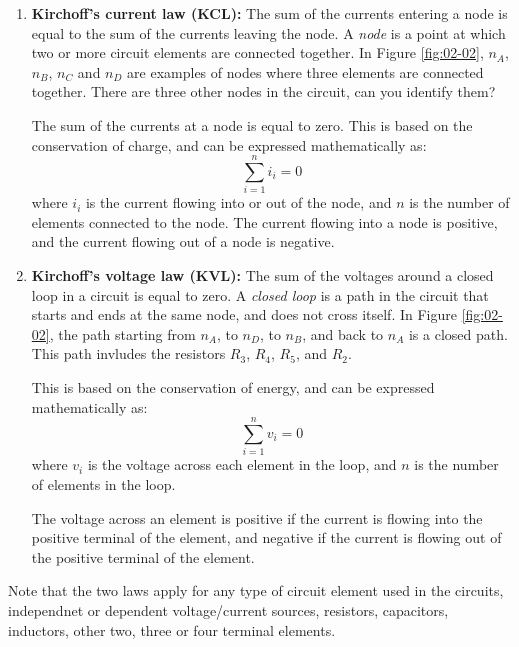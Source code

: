 \begin{enumerate}
    \item \textbf{Kirchoff's current law (KCL):} The sum of the currents entering a node is equal to the sum of the currents leaving the node. A \textit{node} is a point at which two or more circuit elements are connected together. In Figure \ref{fig:02-02}, $n_A$, $n_B$, $n_C$ and $n_D$ are examples of nodes where three elements are connected together. There are three other nodes in the circuit, can you identify them? 
    
    The sum of the currents at a node is equal to zero. This is based on the conservation of charge, and can be expressed mathematically as:
    \begin{equation}
        \sum_{i=1}^{n} i_i = 0
        \label{eq:ch02-11}
    \end{equation}
    where $i_i$ is the current flowing into or out of the node, and $n$ is the number of elements connected to the node. The current flowing into a node is positive, and the current flowing out of a node is negative.
    
    \item \textbf{Kirchoff's voltage law (KVL):} The sum of the voltages around a closed loop in a circuit is equal to zero. A \textit{closed loop} is a path in the circuit that starts and ends at the same node, and does not cross itself. In Figure \ref{fig:02-02}, the path starting from $n_A$, to $n_D$, to $n_B$, and back to $n_A$ is a closed path. This path invludes the resistors $R_3$, $R_4$, $R_5$, and $R_2$. 
    
    This is based on the conservation of energy, and can be expressed mathematically as:
    \begin{equation}
        \sum_{i=1}^{n} v_i = 0
        \label{eq:ch02-12}
    \end{equation}
    where $v_i$ is the voltage across each element in the loop, and $n$ is the number of elements in the loop.

    The voltage across an element is positive if the current is flowing into the positive terminal of the element, and negative if the current is flowing out of the positive terminal of the element.
\end{enumerate}

Note that the two laws apply for any type of circuit element used in the circuits, independnet or dependent voltage/current sources, resistors, capacitors, inductors, other two, three or four terminal elements.

